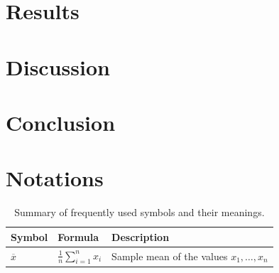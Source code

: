 \documentclass{article}
\begin{document}
\section{Results}
\label{sec:results}

\section{Discussion}
\label{sec:discussion}

\section{Conclusion}
\label{sec:conclusion}


\section*{Notations}

\begin{table}[h!]
    \centering
    \renewcommand{\arraystretch}{1.3}
    \begin{tabular}{llp{7cm}}  %
        \toprule
        \textbf{Symbol} & \textbf{Formula}                              & \textbf{Description} \\
        \midrule
        $\overline{x}$  & $\displaystyle\frac{1}{n} \sum_{i=1}^{n} x_i$
                        & Sample mean of the values $x_1, \dots, x_n$                          \\
        \bottomrule
    \end{tabular}
    \caption{Summary of frequently used symbols and their meanings.}
\end{table}


\printbibliography
\end{document}
